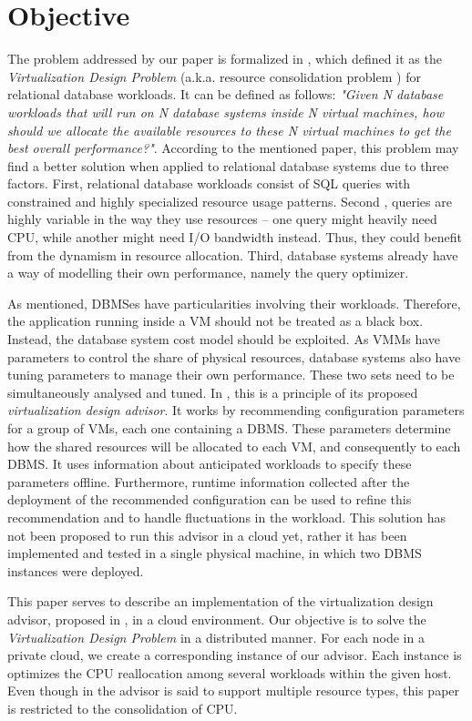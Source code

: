 \section{Objective}

The problem addressed by our paper is formalized in \cite{4401021}, which defined it as the \textit{Virtualization Design Problem} (a.k.a. resource consolidation problem ) for relational database workloads. It can be defined as follows: \textit{"Given N database workloads that will run on N database systems inside N virtual 
machines, how should we allocate the available resources to these N virtual machines to get the best overall performance?"}. According to the mentioned paper, this problem may find a better solution when applied to relational database systems due to three factors. First, relational database workloads consist of SQL queries with constrained and highly specialized resource usage patterns. Second , queries are highly variable in the way they use resources -- one query might heavily need CPU, while another might need I/O bandwidth instead. Thus, they could benefit from the dynamism in resource allocation. Third, database systems already have a way of modelling their own performance, namely the query optimizer.

As mentioned, DBMSes have particularities involving their workloads. Therefore, the application running inside a VM should not be treated as a black box. Instead, the database system cost model should be exploited. As VMMs have parameters to control the share of physical resources, database systems also have tuning parameters to manage their own performance. These two sets need to be simultaneously analysed and tuned. In \cite{Soror:2008:AVM:1376616.1376711}, this is a principle of its proposed \textit{virtualization design advisor}. It works by recommending configuration parameters for a group of VMs, each one containing a DBMS. These parameters determine how the shared resources will be allocated to each VM, and consequently to each DBMS. It uses information about anticipated workloads to specify these parameters offline. Furthermore, runtime information collected after the deployment of the recommended configuration can be used to refine this recommendation and to handle fluctuations in the workload. This 
solution has 
not been proposed to run this advisor in a cloud yet, rather it has been implemented and tested in a single physical machine, in which two DBMS instances were deployed.

This paper serves to describe an implementation of the virtualization design advisor, proposed in \cite{Soror:2008:AVM:1376616.1376711}, in a cloud environment. Our objective is to solve the \textit{Virtualization Design Problem} in a distributed manner. For each node in a private cloud, we create a corresponding instance of our advisor. Each instance is optimizes the CPU reallocation among several workloads within the given host. Even though in \cite{Soror:2008:AVM:1376616.1376711} the advisor is said to support multiple resource types, this paper is restricted to the consolidation of CPU.

